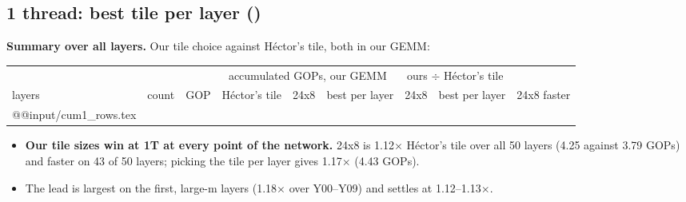 \subsection{1 thread: best tile per layer ()}\label{sec:1t}
\textbf{Summary over all layers.} Our tile choice against H\'ector's tile, both in our GEMM:
\begin{center}\small\setlength\tabcolsep{4pt}
\begin{tabular}{@{}l r r rrr rr c@{}}
\toprule
 & & & \multicolumn{3}{c}{accumulated GOPs, our GEMM} & \multicolumn{2}{c}{ours $\div$ H\'ector's tile} & \\
\cmidrule(lr){4-6}\cmidrule(lr){7-8}
layers & count & GOP & H\'ector's tile & 24x8 & best per layer & 24x8 & best per layer & 24x8 faster \\
\midrule
\csname @@input\endcsname \V/cum1_rows.tex
\bottomrule
\end{tabular}
\end{center}
\begin{itemize}\setlength\itemsep{1pt}
\item \textbf{Our tile sizes win at 1T at every point of the network.} 24x8 is 1.12$\times$ H\'ector's tile over all 50 layers (4.25 against 3.79 GOPs) and faster on 43 of 50 layers; picking the tile per layer gives 1.17$\times$ (4.43 GOPs).
\item The lead is largest on the first, large-m layers (1.18$\times$ over Y00--Y09) and settles at 1.12--1.13$\times$.
\end{itemize}


